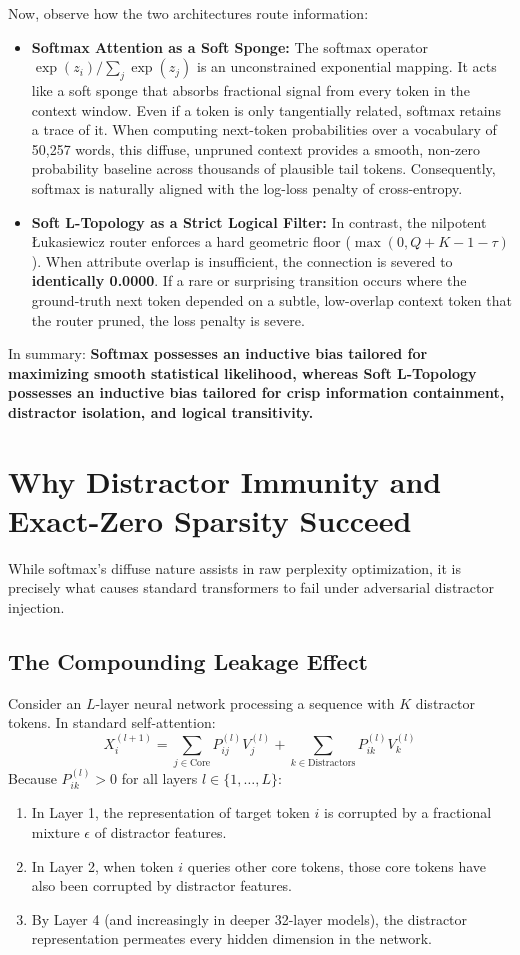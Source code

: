Now, observe how the two architectures route information:
\begin{itemize}
    \item \textbf{Softmax Attention as a Soft Sponge:} The softmax operator $\exp(z_i) / \sum_j \exp(z_j)$ is an unconstrained exponential mapping. It acts like a soft sponge that absorbs fractional signal from every token in the context window. Even if a token is only tangentially related, softmax retains a trace of it. When computing next-token probabilities over a vocabulary of 50,257 words, this diffuse, unpruned context provides a smooth, non-zero probability baseline across thousands of plausible tail tokens. Consequently, softmax is naturally aligned with the log-loss penalty of cross-entropy.
    \item \textbf{Soft L-Topology as a Strict Logical Filter:} In contrast, the nilpotent \L{}ukasiewicz router enforces a hard geometric floor ($\max(0, Q + K - 1 - \tau)$). When attribute overlap is insufficient, the connection is severed to \textbf{identically 0.0000}. If a rare or surprising transition occurs where the ground-truth next token depended on a subtle, low-overlap context token that the router pruned, the loss penalty is severe.
\end{itemize}

In summary: \textbf{Softmax possesses an inductive bias tailored for maximizing smooth statistical likelihood, whereas Soft L-Topology possesses an inductive bias tailored for crisp information containment, distractor isolation, and logical transitivity.}

\section{Why Distractor Immunity and Exact-Zero Sparsity Succeed}
While softmax's diffuse nature assists in raw perplexity optimization, it is precisely what causes standard transformers to fail under adversarial distractor injection.

\subsection{The Compounding Leakage Effect}
Consider an $L$-layer neural network processing a sequence with $K$ distractor tokens. In standard self-attention:
\begin{equation}
X^{(l+1)}_i = \sum_{j \in \text{Core}} P_{ij}^{(l)} V_j^{(l)} + \sum_{k \in \text{Distractors}} P_{ik}^{(l)} V_k^{(l)}
\end{equation}
Because $P_{ik}^{(l)} > 0$ for all layers $l \in \{1, \dots, L\}$:
\begin{enumerate}
    \item In Layer 1, the representation of target token $i$ is corrupted by a fractional mixture $\epsilon$ of distractor features.
    \item In Layer 2, when token $i$ queries other core tokens, those core tokens have also been corrupted by distractor features.
    \item By Layer 4 (and increasingly in deeper 32-layer models), the distractor representation permeates every hidden dimension in the network.
\end{enumerate}

